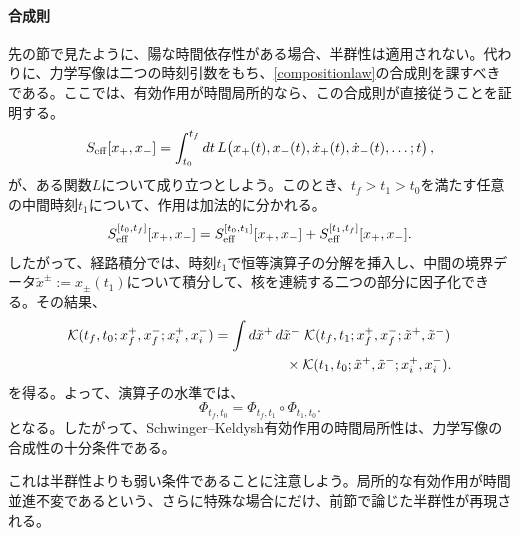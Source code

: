 \documentclass[a4paper,11pt,oneside]{article}
\theoremstyle{definition}
\numberwithin{equation}{section}
\begin{document}
\paragraph{合成則} 先の節で見たように、陽な時間依存性がある場合、半群性は適用されない。代わりに、力学写像は二つの時刻引数をもち、\eqref{compositionlaw}の合成則を課すべきである。ここでは、有効作用が時間局所的なら、この合成則が直接従うことを証明する。
\begin{equation}\label{localSKaction}
S_{\rm eff}[x_+,x_-]
=
\int_{t_0}^{t_f} dt\,
L
\bigl(
x_+(t),x_-(t),\dot x_+(t),\dot x_-(t),\ldots;t
\bigr) \,,
\end{equation}
が、ある関数$ L$について成り立つとしよう。このとき、\(t_f>t_1>t_0\)を満たす任意の中間時刻\(t_1\)について、作用は加法的に分かれる。
\begin{equation}
S_{\rm eff}^{[t_0,t_f]}[x_+,x_-]
=
S_{\rm eff}^{[t_0,t_1]}[x_+,x_-]
+
S_{\rm eff}^{[t_1,t_f]}[x_+,x_-] .
\end{equation}
したがって、経路積分では、時刻\(t_1\)で恒等演算子の分解を挿入し、中間の境界データ\(\tilde x^\pm:=x_\pm(t_1)\)について積分して、核を連続する二つの部分に因子化できる。その結果、
\begin{align}\label{compositionkernel}
\mathcal K(t_f,t_0;x_f^+,x_f^-;x_i^+,x_i^-)
&=
\int d\tilde x^+\,d\tilde x^- \;
\mathcal K(t_f,t_1;x_f^+,x_f^-;\tilde x^+,\tilde x^-)
\nonumber\\
&\hspace{1.8cm}\times
\mathcal K(t_1,t_0;\tilde x^+,\tilde x^-;x_i^+,x_i^-) .
\end{align}
を得る。よって、演算子の水準では、
\begin{equation}
\Phi_{t_f,t_0}=\Phi_{t_f,t_1}\circ \Phi_{t_1,t_0} .
\end{equation}
となる。したがって、Schwinger--Keldysh有効作用の時間局所性は、力学写像の合成性の十分条件である。



これは半群性よりも弱い条件であることに注意しよう。局所的な有効作用が時間並進不変であるという、さらに特殊な場合にだけ、前節で論じた半群性が再現される。
\end{document}
